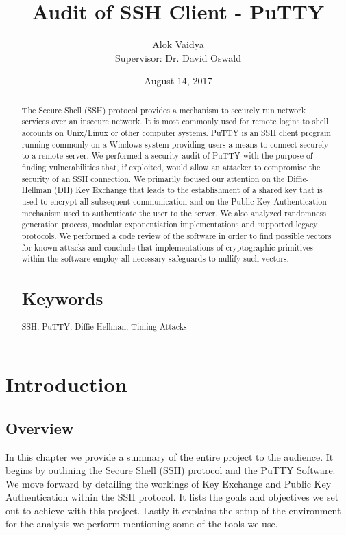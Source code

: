 \documentclass{report}
\title {Audit of SSH Client - PuTTY}
\author{Alok Vaidya\\[1cm]{\large Supervisor: Dr. David Oswald}}
\date{August 14, 2017}
\begin{document}
\maketitle
\tableofcontents
\begin{abstract}
The Secure Shell (SSH) protocol provides a mechanism to securely run network services over an insecure network. It is most commonly used for remote logins to shell accounts on Unix/Linux or other computer systems. PuTTY is an SSH client program running commonly on a Windows system providing users a means to connect securely to a remote server. We performed a security audit of PuTTY with the purpose of finding vulnerabilities that, if exploited, would allow an attacker to compromise the security of an SSH connection. We primarily focused our attention on the Diffie-Hellman (DH) Key Exchange that leads to the establishment of a shared key that is used to encrypt all subsequent communication and on the Public Key Authentication mechanism used to authenticate the user to the server. We also analyzed randomness generation process, modular exponentiation implementations and supported legacy protocols. We performed a code review of the software in order to find possible vectors for known attacks and conclude that implementations of cryptographic primitives within the software employ all necessary safeguards to nullify such vectors.
\section{Keywords}
SSH, PuTTY, Diffie-Hellman, Timing Attacks
\end{abstract}
\chapter{Introduction}
\section{Overview}
In this chapter we provide a summary of the entire project to the audience. It begins by outlining the Secure Shell (SSH) protocol and the PuTTY Software. We move forward by detailing the workings of Key Exchange and Public Key Authentication within the SSH protocol. It lists the goals and objectives we set out to achieve with this project. Lastly it explains the setup of the environment for the analysis we perform mentioning some of the tools we use.
\end{document}
